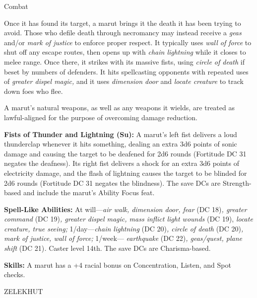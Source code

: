 \documentclass{article}
\begin{document}
Combat

Once it has found its target, a marut brings it the death it has been trying to 
avoid. Those who defile death through necromancy may instead receive a \textit{geas 
}and/or \textit{mark of justice }to enforce proper respect. It typically uses \textit{wall 
of force }to shut off any escape routes, then opens up with \textit{chain lightning 
}while it closes to melee range. Once there, it strikes with its massive fists, 
using \textit{circle of death }if beset by numbers of defenders. It hits spellcasting 
opponents with repeated uses of \textit{greater dispel magic, }and it uses \textit{dimension 
door }and \textit{locate creature }to track down foes who flee.

A marut's natural weapons, as well as any weapons it wields, are treated as lawful-aligned 
for the purpose of overcoming damage reduction.

\textbf{Fists of Thunder and Lightning (Su):} A marut's left fist delivers a loud 
thunderclap whenever it hits something, dealing an extra 3d6 points of sonic damage 
and causing the target to be deafened for 2d6 rounds (Fortitude DC 31 negates the 
deafness). Its right fist delivers a shock for an extra 3d6 points of electricity 
damage, and the flash of lightning causes the target to be blinded for 2d6 rounds 
(Fortitude DC 31 negates the blindness). The save DCs are Strength-based and include 
the marut's Ability Focus feat.

\textbf{Spell-Like Abilities:} At will---\textit{air walk, dimension door, fear 
}(DC 18)\textit{, greater command }(DC 19)\textit{, greater dispel magic, mass 
inflict light wounds }(DC 19), \textit{locate creature, true seeing; }1/day---\textit{chain 
lightning }(DC 20)\textit{, circle of death }(DC 20)\textit{, mark of justice, 
wall of force; }1/week--- \textit{earthquake }(DC 22)\textit{, geas/quest, plane 
shift }(DC 21)\textit{. }Caster level 14th. The save DCs are Charisma-based.

\textbf{Skills:} A marut has a +4 racial bonus on Concentration, Listen, and Spot 
checks.

\vspace{12pt}
ZELEKHUT
\end{document}
